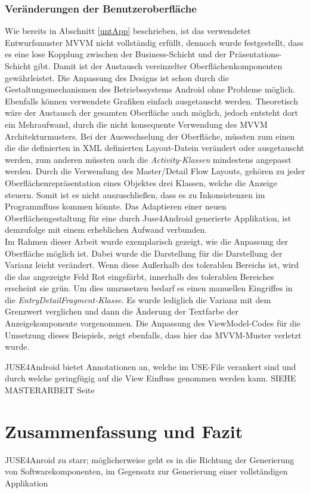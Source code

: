 \documentclass[a4paper,twoside]{article}
\begin{document}
\subsubsection{Veränderungen der Benutzeroberfläche}
Wie bereits in Abschnitt \ref{untApp} beschrieben, ist das verwendetet Entwurfsmuster MVVM nicht vollständig erfüllt, dennoch wurde festgestellt, dass es eine lose Kopplung zwischen der Business-Schicht und der Präsentations-Schicht gibt. Damit ist der Austausch vereinzelter Oberflächenkomponenten gewährleistet. Die Anpassung des Designs ist schon durch die Gestaltungsmechanismen des Betriebssystems Android ohne Probleme möglich. Ebenfalls können verwendete Grafiken einfach ausgetauscht werden. Theoretisch wäre der Austausch der gesamten Oberfläche auch möglich, jedoch entsteht dort ein Mehraufwand, durch die nicht konsequente Verwendung des MVVM Architekturmusters. Bei der Auswechselung der Oberfläche, müssten zum einen die die definierten in XML definierten Layout-Datein verändert oder ausgetauscht werden, zum anderen müssten auch die \textit{Activity-Klassen} mindestens angepasst werden. Durch die Verwendung des Master/Detail Flow Layouts, gehören zu jeder Oberflächenrepräsentation eines Objektes drei Klassen, welche die Anzeige steuern. Somit ist es nicht auszuschließen, dass es zu Inkonsistenzen im Programmfluss kommen könnte. Das Adaptieren einer neuen Oberflächengestaltung für eine durch Juse4Android generierte Applikation, ist demzufolge mit einem erheblichen Aufwand verbunden.\\
Im Rahmen dieser Arbeit wurde exemplarisch gezeigt, wie die Anpassung der Oberfläche möglich ist. Dabei wurde die Darstellung für die Darstellung der Varianz leicht verändert. Wenn diese Außerhalb des tolerablen Bereichs ist, wird die das angezeigte Feld Rot eingefärbt, innerhalb des tolerablen Bereiches erscheint sie grün. Um dies umzusetzen bedarf es einen manuellen Eingriffes in die \textit{EntryDetailFragment-Klasse}. Es wurde lediglich  die Varianz mit dem Grenzwert verglichen und dann die Änderung der Textfarbe der Anzeigekomponente vorgenommen. Die Anpassung des ViewModel-Codes für die Umsetzung dieses Beispiels, zeigt ebenfalls, dass hier das MVVM-Muster verletzt wurde.

JUSE4Android bietet Annotationen an, welche im USE-File verankert sind und durch welche geringfügig auf die View Einfluss genommen werden kann. SIEHE MASTERARBEIT Seite


\section{Zusammenfassung und Fazit}
JUSE4Anroid zu starr; möglicherweise geht es in die Richtung der Generierung von Softwarekomponenten, im Gegensatz zur Generierung einer vollständigen Applikation
\vfill

{\small
}
\end{document}
